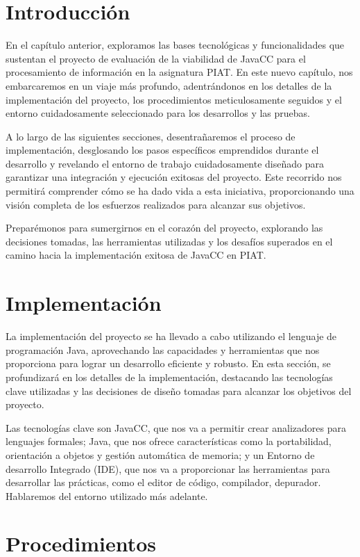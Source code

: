 \section{Introducción}
\noindent En el capítulo anterior, exploramos las bases tecnológicas y funcionalidades que sustentan el proyecto de evaluación de la viabilidad de JavaCC para el procesamiento de información en la asignatura PIAT. En este nuevo capítulo, nos embarcaremos en un viaje más profundo, adentrándonos en los detalles de la implementación del proyecto, los procedimientos meticulosamente seguidos y el entorno cuidadosamente seleccionado para los desarrollos y las pruebas.

A lo largo de las siguientes secciones, desentrañaremos el proceso de implementación, desglosando los pasos específicos emprendidos durante el desarrollo y revelando el entorno de trabajo cuidadosamente diseñado para garantizar una integración y ejecución exitosas del proyecto. Este recorrido nos permitirá comprender cómo se ha dado vida a esta iniciativa, proporcionando una visión completa de los esfuerzos realizados para alcanzar sus objetivos.

Preparémonos para sumergirnos en el corazón del proyecto, explorando las decisiones tomadas, las herramientas utilizadas y los desafíos superados en el camino hacia la implementación exitosa de JavaCC en PIAT.

\section{Implementación}
\noindent La implementación del proyecto se ha llevado a cabo utilizando el lenguaje de programación Java, aprovechando las capacidades y herramientas que nos proporciona para lograr un desarrollo eficiente y robusto. En esta sección, se profundizará en los detalles de la implementación, destacando las tecnologías clave utilizadas y las decisiones de diseño tomadas para alcanzar los objetivos del proyecto. 

Las tecnologías clave son JavaCC, que nos va a permitir crear analizadores para lenguajes formales; Java, que nos ofrece características como la portabilidad, orientación a objetos y gestión automática de memoria; y un Entorno de desarrollo Integrado (IDE), que nos va a proporcionar las herramientas para desarrollar las prácticas, como el editor de código, compilador, depurador. Hablaremos del entorno utilizado más adelante.

\section{Procedimientos}

